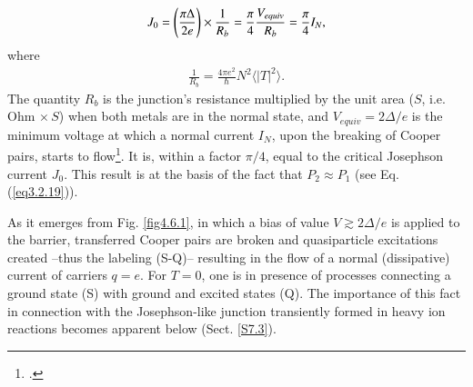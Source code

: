 \begin{align}\label{eq4.7.20}
J_0=\left(\frac{\pi\Delta}{2e}\right)\times\frac{1}{R_b}=\frac{\pi}{4}\frac{V_{equiv}}{R_b}=\frac{\pi}{4}I_N, \idx{Josephson effect!equivalent potential} \idx{Josephson effect!critical current}
\end{align}
where
\begin{align}\label{eq4.7.21}
\frac{1}{R_b}=\frac{4\pi e^2}{\hbar}N^2\langle|T|^2\rangle.
\end{align}
The quantity  $R_b$ 
 is the  junction's resistance  multiplied by the   unit area ($S$, i.e. Ohm $\times\, S$)  when both metals are in the normal state, and $V_{equiv}=2\Delta/e$ is the minimum voltage at which a normal current $I_N$, upon the breaking of Cooper pairs, starts to flow\footnote{\cite{Giaver:73}.}. It is, within a factor $\pi/4$,  equal to the critical Josephson current $J_0$. This result is at the basis of the fact that  $P_2\approx P_1$ (see Eq. (\ref{eq3.2.19})).
  
  

  
As it emerges from Fig. \ref{fig4.6.1}, in which a bias of value $V\gtrsim2\Delta/e$ is applied to the barrier, transferred Cooper pairs are broken and quasiparticle excitations created --thus the labeling (S-Q)-- resulting in the flow of a normal (dissipative) current of carriers $q=e$. For $T=0$, one is in presence of processes connecting a ground state (S) with ground and excited states (Q). The importance of this fact in connection with the Josephson-like junction transiently formed in heavy ion reactions becomes apparent below (Sect. \ref{S7.3}).
  
